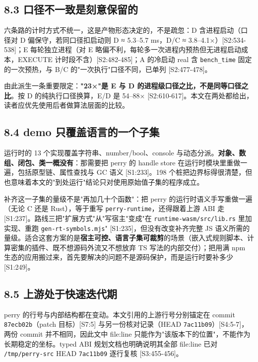 \documentclass[11pt, a4paper]{article}
\begin{document}
\subsection{8.3 口径不一致是刻意保留的}

六条路的计时方式不统一，这是产物形态决定的，不是疏忽：D 含进程启动（口径对 D 偏保守，若同口径扣启动则 D ≈ 5.3–5.7 ms，D/C ≈ 3.8–4.1×）[S2:534-538]；E 每轮独立进程（对 E 略偏不利，每轮多一次进程内预热但无进程启动成本，EXECUTE 计时段不含）[S2:482-485]；A 的冷启动 real 含 \texttt{bench\_time} 固定的一次预热，与 B/C 的"一次执行"口径不同，已单列 [S2:477-478]。


由此派生一条重要限定：\textbf{"23×"是 E 与 D 的进程级口径之比，不是同等口径之比}。按 D 的纯执行口径换算，E/D 是 54–88× [S2:610-617]。本文在两处都给出，读者应优先使用后者做算法层面的比较。


\subsection{8.4 demo 只覆盖语言的一个子集}

运行时的 13 个实现覆盖字符串、number/bool、console 与动态分派。\textbf{对象、数组、闭包、类一概没有}：那需要把 perry 的 handle store 在运行时模块里重做一遍，包括原型链、属性查找与 GC 语义 [S1:233]。198 个桩把边界标得很清楚，但也意味着本文的"到处运行"结论只对使用原始值子集的程序成立。


补齐这一子集的量级不是"再加几十个函数"：把 perry 的运行时语义手写重做一遍（无论 C 还是 Rust），等于重写 \texttt{perry-runtime}，还得跟着上游 ABI 走 [S1:237]。路线三把"扩展方式"从"写宿主"变成"在 \texttt{runtime-wasm/src/lib.rs} 里加实现、重跑 \texttt{gen-rt-symbols.mjs}" [S1:235]，但没有改变补齐完整 JS 语义所需的量级。适合这套方案的是\textbf{宿主可控、语言子集可裁剪}的场景（嵌入式规则脚本、计算密集的插件、既不想源码外流又不想放弃 TS 写法的内部交付）；把用满 npm 生态的应用搬过来，首先要解决的问题不是源码保护，而是运行时要补多少 [S1:249]。


\subsection{8.5 上游处于快速迭代期}

perry 的行号与内部结构都在变动。本文引用的上游行号分别锚定在 commit \texttt{87ecb02b}（patch 目标）[S7:5] 与另一份核对记录（HEAD \texttt{7ac11b09}）[S4:5-7]，两份 commit 并不相同，因此文中 file:line 只能作为"该版本下的位置"，不能作为长期稳定的坐标。typed ABI 规划文档也明确说明其全部 file:line 已对 \texttt{/tmp/perry-src} HEAD \texttt{7ac11b09} 逐行复核 [S3:455-456]。
\end{document}
